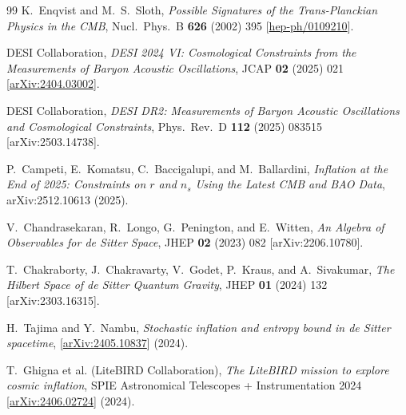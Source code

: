 \documentclass[a4paper,11pt]{article}
\begin{document}
\begin{thebibliography}{99}
K.~Enqvist and M.~S.~Sloth,
\textit{Possible Signatures of the Trans-Planckian Physics in the CMB},
Nucl.\ Phys.\ B \textbf{626} (2002) 395
[\href{https://arxiv.org/abs/hep-ph/0109210}{hep-ph/0109210}].

DESI Collaboration,
\textit{DESI 2024 VI: Cosmological Constraints from the
Measurements of Baryon Acoustic Oscillations},
JCAP \textbf{02} (2025) 021
[\href{https://arxiv.org/abs/2404.03002}{arXiv:2404.03002}].

DESI Collaboration,
\textit{DESI DR2: Measurements of Baryon Acoustic Oscillations
and Cosmological Constraints},
Phys.\ Rev.\ D \textbf{112} (2025) 083515 [arXiv:2503.14738].

P.~Campeti, E.~Komatsu, C.~Baccigalupi, and
M.~Ballardini,
\textit{Inflation at the End of 2025: Constraints on $r$
and $n_s$ Using the Latest CMB and BAO Data},
arXiv:2512.10613 (2025).

V.~Chandrasekaran, R.~Longo, G.~Penington, and E.~Witten,
\textit{An Algebra of Observables for de Sitter Space},
JHEP \textbf{02} (2023) 082 [arXiv:2206.10780].

T.~Chakraborty, J.~Chakravarty, V.~Godet, P.~Kraus,
and A.~Sivakumar,
\textit{The Hilbert Space of de Sitter Quantum Gravity},
JHEP \textbf{01} (2024) 132 [arXiv:2303.16315].

H.~Tajima and Y.~Nambu,
\textit{Stochastic inflation and entropy bound in de Sitter spacetime},
[\href{https://arxiv.org/abs/2405.10837}{arXiv:2405.10837}] (2024).

T.~Ghigna et al. (LiteBIRD Collaboration),
\textit{The LiteBIRD mission to explore cosmic inflation},
SPIE Astronomical Telescopes + Instrumentation 2024
[\href{https://arxiv.org/abs/2406.02724}{arXiv:2406.02724}] (2024).

\end{thebibliography}
\end{document}
